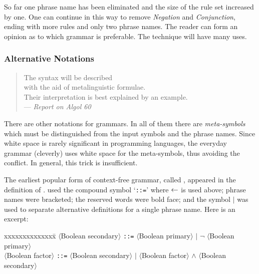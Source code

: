 \begin{enumerate}
\noindent So far one phrase name has been eliminated 
and the size of the rule set increased by one.  
One can continue in this way to remove {\em Negation} 
and {\em Conjunction}, ending with more rules and only two phrase names.  
The reader can form an opinion as to which grammar is preferable.  
The technique will have many uses.

\subsubsection{Alternative Notations}

\begin{quote}\raggedleft
					The syntax will be described 	\\
				with the aid of metalinguistic formulae.\\
		Their interpretation is best explained by an example.	\\
					--- {\em Report on Algol 60}
\end{quote}

\noindent
There are other notations for grammars.  
In all of them there are {\em meta-symbols} 
which must be distinguished from the input symbols and the phrase names.  
Since white space is rarely significant in programming languages, 
the everyday grammar (cleverly) uses white space for the meta-symbols, 
thus avoiding the conflict.  
In general, this trick is insufficient.

The earliest popular form of context-free grammar, called , 
appeared in the definition of .  
 used the compound symbol `{\tt::=}' where $\mbox{$\leftarrow$}$ is used above; 
phrase names were bracketed; the reserved words were bold face; 
and the symbol $|$ was used to separate alternative definitions 
for a single phrase name.  Here is an excerpt:

\begin{samepage}
\begin{center}
\begin{tabbing}
xxxxxxxxxxxxxx\=\kill
$\langle$Boolean secondary$\rangle$ {\tt::=} 
$\langle$Boolean primary$\rangle$ 
$|$ $\neg$ $\langle$Boolean primary$\rangle$ \\

$\langle$Boolean factor$\rangle$ {\tt::=}
$\langle$Boolean secondary$\rangle$  
$|$ $\langle$Boolean factor$\rangle$ $\wedge$ 
$\langle$Boolean secondary$\rangle$  \\


\end{tabbing}
\end{center}
\end{samepage}
\end{enumerate}
